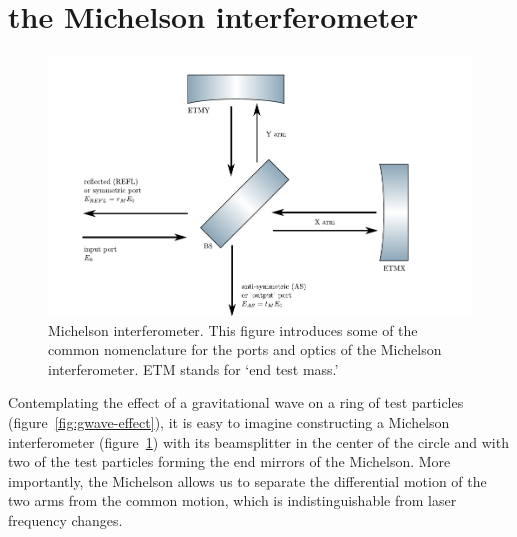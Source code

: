 \section{the Michelson interferometer}
\begin{figure}
\centering\includegraphics{figures/michelson.pdf}
\caption[Michelson interferometer]{\label{fig:michelson}Michelson
  interferometer.  This figure introduces some of the common
  nomenclature for the ports and optics of the Michelson
  interferometer.  ETM stands for `end test mass.'}
\end{figure}

Contemplating the effect of a gravitational wave on a ring of test
particles (figure~\ref{fig:gwave-effect}), it is easy to imagine
constructing a Michelson interferometer (figure~\ref{fig:michelson})
with its beamsplitter in the center of the circle and with two of the
test particles forming the end mirrors of the Michelson.  More
importantly, the Michelson allows us to separate the differential
motion of the two arms from the common motion, which is
indistinguishable from laser frequency changes.

